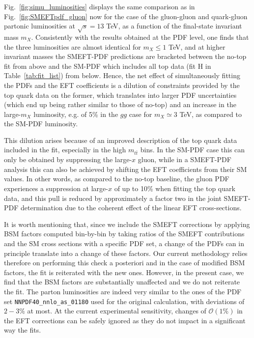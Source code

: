 \documentclass[withindex,glossary]{cam-thesis}
\begin{document}
Fig.~\ref{fig:simu_luminosities} displays the same comparison
as in Fig.~\ref{fig:SMEFTpdf_gluon} now for the case of the gluon-gluon and quark-gluon 
partonic luminosities at $\sqrt{s}=13$ TeV, as a function of the final-state
invariant mass $m_X$.
%
Consistently with the results obtained at the PDF level, one finds that
the three luminosities are almost identical for $m_X \le 1$ TeV, and
at higher invariant masses the SMEFT-PDF predictions are bracketed
between the no-top fit from above and the SM-PDF which includes
all top data (fit H in Table~\ref{tab:fit_list}) from below.
%
Hence, the net effect of simultaneously fitting the PDFs
and the EFT coefficients  is a dilution of constraints
provided by the top quark data on the former,
which translates into larger PDF uncertainties (which end up being rather similar to
those of no-top) and an increase
in the large-$m_X$ luminosity, e.g. of 5\% in the $gg$ case for $m_X\simeq 3$ TeV,
as compared to the SM-PDF luminosity.

This dilution arises because of an improved description of the top quark
data included in the fit, especially in the high $m_{t\bar{t}}$ bins.
In the SM-PDF case this can only be obtained by suppressing
the large-$x$ gluon, while in a SMEFT-PDF analysis this can also be achieved by shifting the EFT coefficients
from their SM values.
%
In other words, as compared to the no-top baseline, the gluon PDF experiences
a suppression at large-$x$ of up to 10\% when fitting the top quark data, and this
pull is reduced by approximately a factor two in the joint SMEFT-PDF determination due to the
coherent effect of the linear EFT cross-sections.

It is worth mentioning that, since we include the SMEFT corrections by applying BSM factors computed bin-by-bin by taking ratios of the SMEFT contributions and the SM cross sections with a specific PDF set, a change of the PDFs can in principle translate into a change of these factors. Our current methodology relies therefore on performing this check a posteriori and in the case of modified  BSM factors, the fit is reiterated with the new ones. However, in the present case, we find that the BSM factors are substantially unaffected and we do not reiterate the fit. The parton luminosities are indeed very similar to the ones of the PDF set \texttt{NNPDF40\_nnlo\_as\_01180} used for the original calculation, with deviations of $2-3\%$ at most. At the current experimental sensitivity, changes of $\mathcal{O}(1\%)$ in the EFT corrections can be safely ignored as they do not impact in a significant way the fits.
\end{document}
